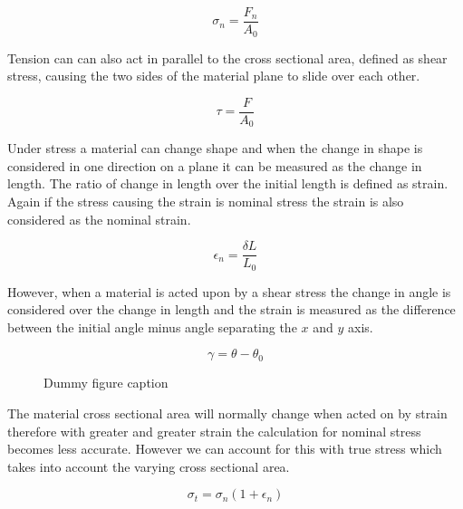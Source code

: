 \documentclass[a4paper,10pt]{article}
\begin{document}
\begin{equation}
 \label{Nominal Stress}
 \sigma_n = \frac{F_n}{A_0}
\end{equation}

Tension can can also act in parallel to the cross sectional area, defined as shear stress, causing the two sides of the material plane to slide over each other. 

\begin{equation}
 \label{Shear Stress}
 \tau = \frac{F}{A_0}
\end{equation}

Under stress a material can change shape and when the change in shape is considered in one direction on a plane it can be measured as the change in length. The ratio of change in length over the initial length is defined as strain. Again if the stress causing the strain is nominal stress the strain is also considered as the nominal strain.

\begin{equation}
 \label{Nominal Strain}
 \epsilon_n = \frac{\delta L}{L_0}
\end{equation}

However, when a material is acted upon by a shear stress the change in angle is considered over the change in length and the strain is measured as the difference between the initial angle minus angle separating the $x$ and $y$ axis.

\begin{equation}
 \label{Shear Strain}
 \gamma = \theta - \theta_0
\end{equation}

\newcommand{\dummyfig}[1]{
  \centering
  \fbox{
    \begin{minipage}[c][0.1\textheight][c]{0.7\textwidth}
      \centering{#1}
    \end{minipage}
  }
}

\begin{figure}[h]
  \dummyfig{Dummy Figure Label} 
  \caption{Dummy figure caption}
  \label{fig:dummy}
\end{figure}

The material cross sectional area will normally change when acted on by strain therefore with greater and greater strain the calculation for nominal stress becomes less accurate. However we can account for this with true stress which takes into account the varying cross sectional area.
 
\begin{equation}
 \label{True Stress}
 \sigma_t =\sigma_n(1 + \epsilon_n) 
\end{equation}
\end{document}
